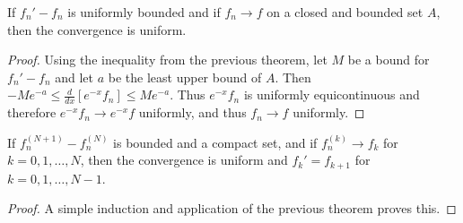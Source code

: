         \begin{theorem}
            If $f_n' - f_n$ is uniformly bounded and if $f_n \rightarrow f$ on a closed and bounded set $A$, then the convergence is uniform.
        \end{theorem}
        \begin{proof}
            Using the inequality from the previous theorem, let $M$ be a bound for $f_n'-f_n$ and let $a$ be the least upper bound of $A$. Then $-Me^{-a}\leq \frac{d}{dx}[e^{-x}f_n] \leq Me^{-a}$. Thus $e^{-x}f_n$ is uniformly equicontinuous and therefore $e^{-x}f_n\rightarrow e^{-x}f$ uniformly, and thus $f_n\rightarrow f$ uniformly.
        \end{proof}
        \begin{theorem}
            If $f_n^{(N+1)}-f_n^{(N)}$ is bounded and a compact set, and if $f_n^{(k)}\rightarrow f_k$ for $k=0,1,\hdots, N$, then the convergence is uniform and $f_{k}' = f_{k+1}$ for $k=0,1,\hdots,N-1$.
        \end{theorem}
        \begin{proof}
            A simple induction and application of the previous theorem proves this.
        \end{proof}
